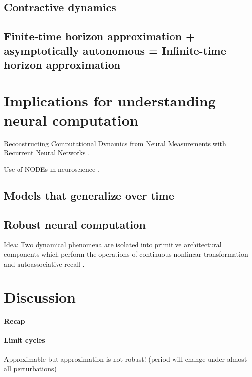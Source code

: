 \documentclass{article}
\theoremstyle{definition}
\theoremstyle{remark}
\newcounter{ct}
\begin{document}
\subsection{Contractive dynamics}


\subsection{Finite-time horizon approximation + asymptotically autonomous = Infinite-time horizon approximation}





\section{Implications for understanding neural computation}

Reconstructing Computational Dynamics from Neural Measurements with Recurrent Neural Networks \citep{durstewitz2023reconstructing}.

Use of NODEs in neuroscience \citep{kim2021inferring}.


\subsection{Models that generalize over time}



\subsection{Robust neural computation}
Idea: Two dynamical phenomena are isolated into primitive architectural components which perform the operations of continuous nonlinear transformation and autoassociative recall \citep{pineda1988dynamics}.






\section{Discussion}
\paragraph{Recap}	


\paragraph{Limit cycles}
Approximable but approximation is not robust! (period will change under almost all perturbations)
\end{document}
